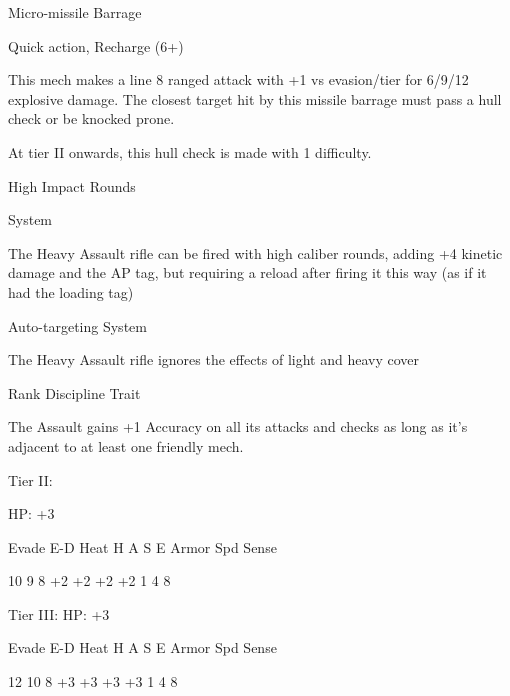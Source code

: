 Micro-missile Barrage
 
Quick action, Recharge (6+)
 
This mech makes a line 8 ranged attack with +1 vs evasion/tier for 6/9/12 explosive damage. The  
closest target hit by this missile barrage must pass a hull check or be knocked prone.
 
At tier II onwards, this hull check is made with 1 difficulty.
 

High Impact Rounds
 
System
 
The Heavy Assault rifle can be fired with high caliber rounds, adding +4 kinetic damage and the  
AP tag, but requiring a reload after firing it this way (as if it had the loading tag)
 

Auto-targeting  
System
 
The Heavy Assault rifle ignores the effects of light and heavy cover
 

Rank Discipline  
Trait
 
The Assault gains +1 Accuracy on all its attacks and checks as long as it’s adjacent to at least  
one friendly mech.
 

Tier II:
 
HP: +3
 

          Evade    E-D    Heat     H    A     S     E       Armor        Spd      Sense 

          10       9      8        +2   +2    +2    +2      1            4        8 

Tier III:  
HP: +3
 

          Evade    E-D    Heat     H    A     S     E       Armor        Spd      Sense 

          12        10    8        +3   +3    +3    +3      1            4        8 

                                                                                                               